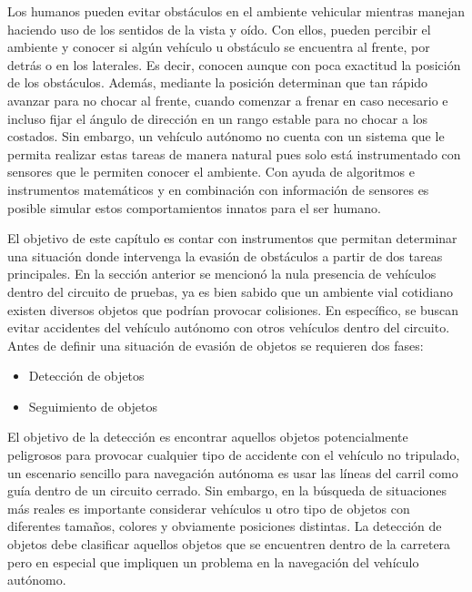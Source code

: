 Los humanos pueden evitar obstáculos en el ambiente vehicular mientras manejan haciendo uso de los sentidos de la vista y oído. Con ellos, pueden percibir el ambiente y conocer si algún vehículo u obstáculo se encuentra al frente, por detrás o en los laterales. Es decir, conocen aunque con poca exactitud la posición de los obstáculos. Además, mediante la posición determinan que tan rápido avanzar para no chocar al frente, cuando comenzar a frenar en caso necesario e incluso fijar el ángulo de dirección en un rango estable para no chocar a los costados. Sin embargo, un vehículo autónomo no cuenta con un sistema que le permita realizar estas tareas de manera natural pues solo está instrumentado con sensores que le permiten conocer el ambiente. Con ayuda de algoritmos e instrumentos matemáticos y en combinación con información de sensores es posible simular estos comportamientos innatos para el ser humano.

El objetivo de este capítulo es contar con instrumentos que permitan determinar una situación donde intervenga la evasión de obstáculos a partir de dos tareas principales. En la sección anterior se mencionó la nula presencia de vehículos dentro del circuito de pruebas, ya es bien sabido que un ambiente vial cotidiano existen diversos objetos que podrían provocar colisiones. En específico, se buscan evitar accidentes del vehículo autónomo con otros vehículos dentro del circuito. Antes de definir una situación de evasión de objetos se requieren dos fases:
\begin{itemize}
    \item Detección de objetos
    \item Seguimiento de objetos
\end{itemize}
El objetivo de la detección es encontrar aquellos objetos potencialmente peligrosos para provocar cualquier tipo de accidente con el vehículo no tripulado, un escenario sencillo para navegación autónoma es usar las líneas del carril como guía dentro de un circuito cerrado. Sin embargo, en la búsqueda de situaciones más reales es importante considerar vehículos u otro tipo de objetos con diferentes tamaños, colores y obviamente posiciones distintas. La detección de objetos debe clasificar aquellos objetos que se encuentren dentro de la carretera pero en especial que impliquen un problema en la navegación del vehículo autónomo.

